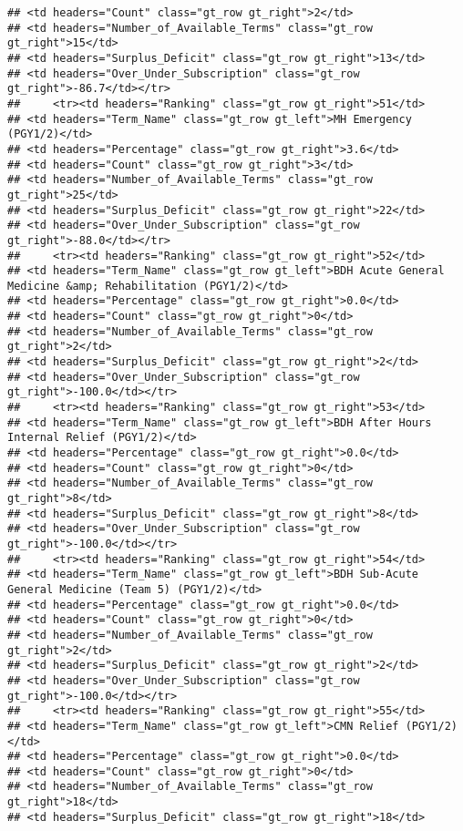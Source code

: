 \documentclass[
]{article}
\begin{document}
\begin{verbatim}
## <td headers="Count" class="gt_row gt_right">2</td>
## <td headers="Number_of_Available_Terms" class="gt_row gt_right">15</td>
## <td headers="Surplus_Deficit" class="gt_row gt_right">13</td>
## <td headers="Over_Under_Subscription" class="gt_row gt_right">-86.7</td></tr>
##     <tr><td headers="Ranking" class="gt_row gt_right">51</td>
## <td headers="Term_Name" class="gt_row gt_left">MH Emergency (PGY1/2)</td>
## <td headers="Percentage" class="gt_row gt_right">3.6</td>
## <td headers="Count" class="gt_row gt_right">3</td>
## <td headers="Number_of_Available_Terms" class="gt_row gt_right">25</td>
## <td headers="Surplus_Deficit" class="gt_row gt_right">22</td>
## <td headers="Over_Under_Subscription" class="gt_row gt_right">-88.0</td></tr>
##     <tr><td headers="Ranking" class="gt_row gt_right">52</td>
## <td headers="Term_Name" class="gt_row gt_left">BDH Acute General Medicine &amp; Rehabilitation (PGY1/2)</td>
## <td headers="Percentage" class="gt_row gt_right">0.0</td>
## <td headers="Count" class="gt_row gt_right">0</td>
## <td headers="Number_of_Available_Terms" class="gt_row gt_right">2</td>
## <td headers="Surplus_Deficit" class="gt_row gt_right">2</td>
## <td headers="Over_Under_Subscription" class="gt_row gt_right">-100.0</td></tr>
##     <tr><td headers="Ranking" class="gt_row gt_right">53</td>
## <td headers="Term_Name" class="gt_row gt_left">BDH After Hours Internal Relief (PGY1/2)</td>
## <td headers="Percentage" class="gt_row gt_right">0.0</td>
## <td headers="Count" class="gt_row gt_right">0</td>
## <td headers="Number_of_Available_Terms" class="gt_row gt_right">8</td>
## <td headers="Surplus_Deficit" class="gt_row gt_right">8</td>
## <td headers="Over_Under_Subscription" class="gt_row gt_right">-100.0</td></tr>
##     <tr><td headers="Ranking" class="gt_row gt_right">54</td>
## <td headers="Term_Name" class="gt_row gt_left">BDH Sub-Acute General Medicine (Team 5) (PGY1/2)</td>
## <td headers="Percentage" class="gt_row gt_right">0.0</td>
## <td headers="Count" class="gt_row gt_right">0</td>
## <td headers="Number_of_Available_Terms" class="gt_row gt_right">2</td>
## <td headers="Surplus_Deficit" class="gt_row gt_right">2</td>
## <td headers="Over_Under_Subscription" class="gt_row gt_right">-100.0</td></tr>
##     <tr><td headers="Ranking" class="gt_row gt_right">55</td>
## <td headers="Term_Name" class="gt_row gt_left">CMN Relief (PGY1/2)</td>
## <td headers="Percentage" class="gt_row gt_right">0.0</td>
## <td headers="Count" class="gt_row gt_right">0</td>
## <td headers="Number_of_Available_Terms" class="gt_row gt_right">18</td>
## <td headers="Surplus_Deficit" class="gt_row gt_right">18</td>

\end{verbatim}
\end{document}
